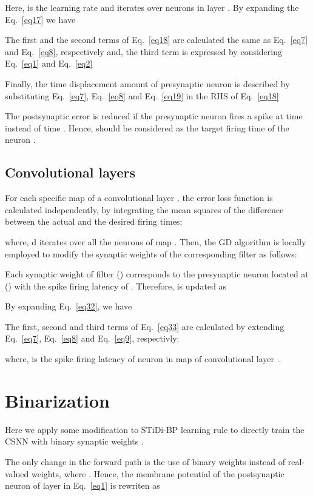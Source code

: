 \documentclass[preprint,twocolumn,5p,12pt]{article}
\begin{document}
Here,  is the learning rate and  iterates over neurons in layer .
By expanding the Eq.~\ref{eq17} we have

The first and the second terms of Eq.~\ref{eq18} are calculated  the same as Eq.~\ref{eq7} and Eq.~\ref{eq8}, respectively and, the third term is expressed by considering Eq.~\ref{eq1} and Eq.~\ref{eq2}


Finally, the time displacement amount of presynaptic neuron  is described by
substituting  Eq.~\ref{eq7}, Eq.~\ref{eq8} and Eq.~\ref{eq19} in the RHS of Eq.~\ref{eq18}

The postsynaptic error  is reduced if the presynaptic neuron  fires a spike at time  instead of time . Hence,  should be considered as the target firing time of the neuron .

\subsection{Convolutional layers}

For each specific map  of a convolutional layer , the error loss function is calculated independently, by integrating the mean squares of the difference between the actual and the desired firing times:

where, d iterates over all the neurons of map . 
Then, the GD algorithm is locally employed to modify the synaptic weights of the corresponding filter  as follows:


Each synaptic weight of filter  () corresponds to the presynaptic neuron located at () with the spike firing latency of .
Therefore,  is updated as 


By expanding Eq.~\ref{eq32}, we have

The first, second and third terms of Eq.~\ref{eq33} are calculated by extending Eq.~\ref{eq7}, Eq.~\ref{eq8} and Eq.~\ref{eq9}, respectivly:





where,  is the spike firing latency of neuron  in map  of convolutional layer .

\section{Binarization}
Here we apply some modification to STiDi-BP learning rule to directly train the CSNN with binary synaptic weights .

The only change in the forward path is the use of binary weights  instead of real-valued weights, where . Hence, the membrane potential of the postsynaptic neuron  of layer   in Eq.~\ref{eq1} is rewriten as
\end{document}
